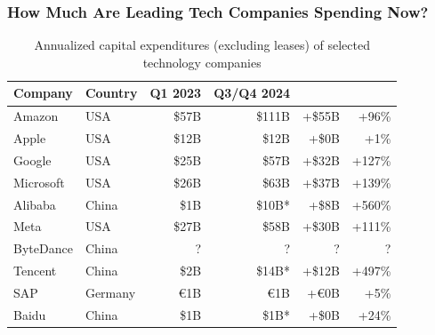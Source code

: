 \documentclass[aspectratio=169]{beamer}
\begin{document}
    \begin{frame}
        \frametitle{How Much Are Leading Tech Companies Spending Now?}
        \begin{table}
            \centering
            \begin{tabular}{llrrrr}
                \toprule
                Company           & Country     & Q1 2023       & Q3/Q4 2024     &                &                \\
                \midrule
                \alert{Amazon}    & \alert{USA} & \alert{\$57B} & \alert{\$111B} & \alert{+\$55B} & \alert{+96\%}  \\
                Apple             & USA         & \$12B         & \$12B          & +\$0B          & +1\%           \\
                \alert{Google}    & \alert{USA} & \alert{\$25B} & \alert{\$57B}  & \alert{+\$32B} & \alert{+127\%} \\
                \alert{Microsoft} & \alert{USA} & \alert{\$26B} & \alert{\$63B}  & \alert{+\$37B} & \alert{+139\%} \\
                Alibaba           & China       & \$1B          & \$10B*         & +\$8B          & +560\%         \\
                \alert{Meta}      & \alert{USA} & \alert{\$27B} & \alert{\$58B}  & \alert{+\$30B} & \alert{+111\%} \\
                ByteDance         & China       & ?             & ?              & ?              & ?              \\
                Tencent           & China       & \$2B          & \$14B*         & +\$12B         & +497\%         \\
                SAP               & Germany     & €1B           & €1B            & +€0B           & +5\%           \\
                Baidu             & China       & \$1B          & \$1B*          & +\$0B          & +24\%          \\
                \bottomrule
            \end{tabular}
            \caption{Annualized capital expenditures (excluding leases) of selected technology companies}
        \end{table}
    \end{frame}
\end{document}
